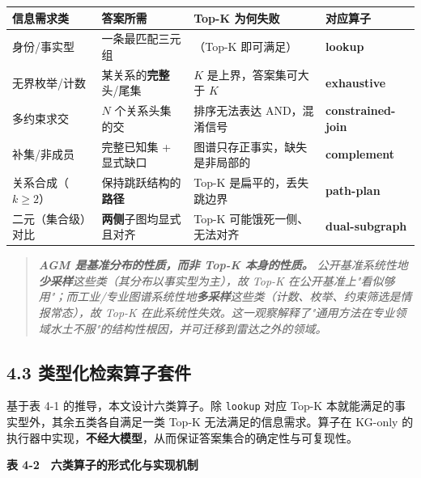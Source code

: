 \documentclass[12pt,a4paper]{ctexart}
\begin{document}
\begin{center}\small
\begin{tabular}{|p{}|p{}|p{}|p{}|}
\hline
\textbf{信息需求类} & \textbf{答案所需} & \textbf{Top-K 为何失败} & \textbf{对应算子} \\ \hline
身份/事实型 & 一条最匹配三元组 & （Top-K 即可满足） & \textbf{lookup} \\ \hline
无界枚举/计数 & 某关系的\textbf{完整}头/尾集 & $K$ 是上界，答案集可大于 $K$ & \textbf{exhaustive} \\ \hline
多约束求交 & $N$ 个关系头集的交 & 排序无法表达 AND，混淆信号 & \textbf{constrained-join} \\ \hline
补集/非成员 & 完整已知集 + 显式缺口 & 图谱只存正事实，缺失是非局部的 & \textbf{complement} \\ \hline
关系合成（$k\ge2$） & 保持跳跃结构的\textbf{路径} & Top-K 是扁平的，丢失跳边界 & \textbf{path-plan} \\ \hline
二元（集合级）对比 & \textbf{两侧}子图均显式且对齐 & Top-K 可能饿死一侧、无法对齐 & \textbf{dual-subgraph} \\ \hline
\end{tabular}
\end{center}

\begin{quote}\itshape \textbf{AGM 是基准分布的性质，而非 Top-K 本身的性质。} 公开基准系统性地\textbf{少采样}这些类（其分布以事实型为主），故 Top-K 在公开基准上"看似够用"；而工业/专业图谱系统性地\textbf{多采样}这些类（计数、枚举、约束筛选是情报常态），故 Top-K 在此系统性失效。这一观察解释了"通用方法在专业领域水土不服"的结构性根因，并可迁移到雷达之外的领域。\end{quote}

\subsection*{4.3 类型化检索算子套件}

基于表 4-1 的推导，本文设计六类算子。除 \texttt{lookup} 对应 Top-K 本就能满足的事实型外，其余五类各自满足一类 Top-K 无法满足的信息需求。算子在 KG-only 的执行器中实现，\textbf{不经大模型}，从而保证答案集合的确定性与可复现性。

\textbf{表 4-2　六类算子的形式化与实现机制}
\end{document}
